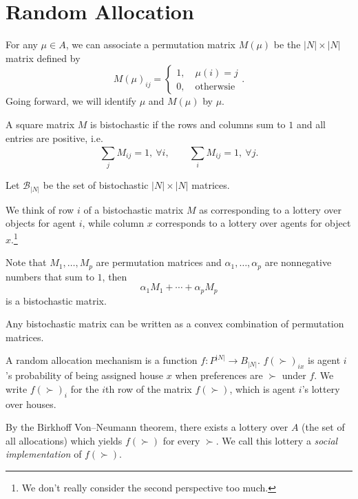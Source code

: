 \section{Random Allocation}

For any $\mu \in A$, we can associate a permutation matrix $M(\mu)$ be the $\left| N \right|\times \left| N \right|$ matrix defined by \[
	M(\mu)_{ij} = \begin{cases}
		1, \quad \mu(i) = j \\
		0, \quad \text{otherwsie}
	\end{cases}
.\] 
Going forward, we will identify $\mu$ and $M(\mu)$ by $\mu$.

\begin{definition}
	A square matrix $M$ is bistochastic if the rows and columns sum to $1$ and all entries are positive, i.e. \[
		\sum\limits_{j} M_{ij} = 1, \ \forall i, \qquad \sum\limits_{i}^{} M_{ij} = 1,\ \forall j
	.\] 

	Let $\mathscr{B}_{\left| N \right|}$ be the set of bistochastic $\left| N \right| \times \left| N \right|$ matrices.
\end{definition}
We think of row $i$ of a bistochastic matrix $M$ as corresponding to a lottery over objects for agent $i$, while column $x$ corresponds to a lottery over agents for object $x$.\footnote{We don't really consider the second perspective too much.}

Note that $M_1,\ldots,M_p$ are permutation matrices and $\alpha_1,\ldots,\alpha_p$ are nonnegative numbers that sum to $1$, then \[
	\alpha_1M_1 + \cdots + \alpha_p M_p
\] is a bistochastic matrix.

\begin{theorem}
	Any bistochastic matrix can be written as a convex combination of permutation matrices.
\end{theorem}

\begin{definition}
	A random allocation mechanism is a function $f: P^{\left| N \right|} \to B_{\left| N \right|}$.
	$f(\succ)_{i x}$ is agent $i$'s probability of being assigned house $x$ when preferences are $\succ$ under $f$.
	We write $f(\succ)_i$ for the $i$th row of the matrix $f(\succ)$, which is agent $i$'s lottery over houses.
\end{definition}

By the Birkhoff Von--Neumann theorem, there exists a lottery over $A$ (the set of all allocations) which yields $f(\succ)$ for every $\succ$.
We call this lottery a \emph{social implementation} of $f(\succ)$.

